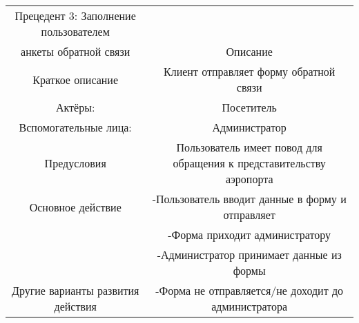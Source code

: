\begin{table}[h]
    \begin{tabular}{|c|c|}
    \hline
    Прецедент 3: Заполнение пользователем\\ анкеты обратной связи          & Описание                                                                                              \\ \hline
    Краткое описание                  & Клиент отправляет форму обратной связи                                                            \\ \hline
    Актёры:                           & Посетитель                                                                                            \\ \hline
    Вспомогательные лица:             & Администратор                                                                                                     \\ \hline
    Предусловия                       & Пользователь имеет повод для обращения к представительству аэропорта                                   \\ \hline
    Основное действие                 & -Пользователь вводит данные в форму и отправляет\\ &-Форма приходит администратору\\ &-Администратор принимает данные из формы \\ \hline
    Другие варианты развития действия & -Форма не отправляется/не доходит до администратора                                      \\ \hline
    \end{tabular}
\end{table}




